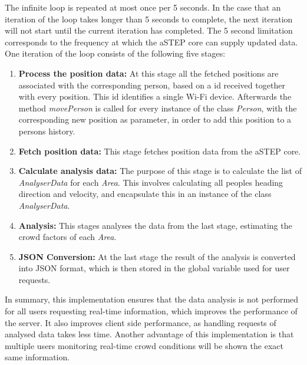 The infinite loop is repeated at most once per 5 seconds. In the case that an iteration of the loop takes longer than 5 seconds to complete, the next iteration will not start until the current iteration has completed. The 5 second limitation corresponds to the frequency at which the aSTEP core can supply updated data. One iteration of the loop consists of the following five stages: 

\begin{enumerate}
    \item \textbf{Process the position data:} At this stage all the fetched positions are associated with the corresponding person, based on a id received together with every position. This id identifies a single Wi-Fi device. Afterwards the method \emph{movePerson} is called for every instance of the class \emph{Person}, with the corresponding new position as parameter, in order to add this position to a persons history.
    \item \textbf{Fetch position data:} This stage fetches position data from the aSTEP core.
    \item \textbf{Calculate analysis data:} The purpose of this stage is to calculate the list of \emph{AnalyserData} for each \emph{Area}. This involves calculating all peoples heading direction and velocity, and encapsulate this in an instance of the class \emph{AnalyserData}.
    \item \textbf{Analysis:} This stages analyses the data from the last stage, estimating the crowd factors of each \emph{Area}.
    \item \textbf{JSON Conversion:} At the last stage the result of the analysis is converted into JSON format, which is then stored in the global variable used for user requests. 
\end{enumerate}

In summary, this implementation ensures that the data analysis is not performed for all users requesting real-time information, which improves the performance of the server. It also improves client side performance, as handling requests of analysed data takes less time. Another advantage of this implementation is that multiple users monitoring real-time crowd conditions will be shown the exact same information.
